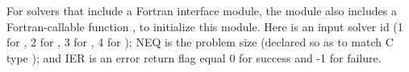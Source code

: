 For solvers that include a Fortran interface module, the {\nvecs} module
also includes a Fortran-callable function ,
to initialize this {\nvecs} module.  Here  is an input solver id
(1 for {\cvode}, 2 for {\ida}, 3 for {\kinsol}, 4 for {\arkode}); NEQ is
the problem size (declared so as to match C type ); and
IER is an error return flag equal 0 for success and -1 for failure.
